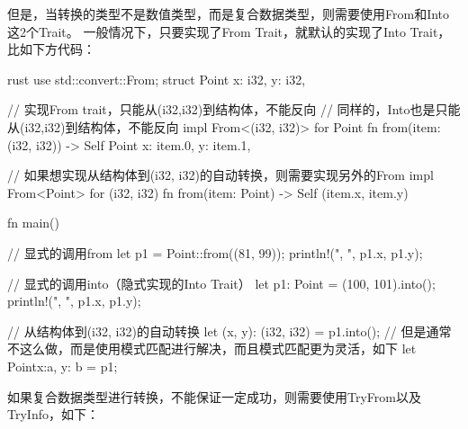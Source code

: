 但是，当转换的类型不是数值类型，而是复合数据类型，则需要使用From和Into这2个Trait。
一般情况下，只要实现了From Trait，就默认的实现了Into Trait，比如下方代码：
\begin{code-block}{rust}
use std::convert::From;
struct Point {
    x: i32,
    y: i32,
}

// 实现From trait，只能从(i32,i32)到结构体，不能反向
// 同样的，Into也是只能从(i32,i32)到结构体，不能反向
impl From<(i32, i32)> for Point {
    fn from(item: (i32, i32)) -> Self {
        Point {
            x: item.0,
            y: item.1,
        }
    }
}

// 如果想实现从结构体到(i32, i32)的自动转换，则需要实现另外的From
impl From<Point> for (i32, i32) {
    fn from(item: Point) -> Self {
        (item.x, item.y)
    }
}

fn main() {
    // 显式的调用from
    let p1 = Point::from((81, 99));
    println!("{}, {}", p1.x, p1.y);

    // 显式的调用into（隐式实现的Into Trait）
    let p1: Point = (100, 101).into();
    println!("{}, {}", p1.x, p1.y);

    // 从结构体到(i32, i32)的自动转换
    let (x, y): (i32, i32) = p1.into();
    // 但是通常不这么做，而是使用模式匹配进行解决，而且模式匹配更为灵活，如下
    let Point{x:a, y: b} = p1;
}
\end{code-block}

如果复合数据类型进行转换，不能保证一定成功，则需要使用TryFrom以及TryInfo，如下：

